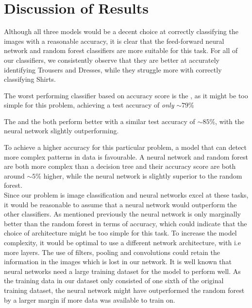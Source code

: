 \section{Discussion of Results}
Although all three models would be a decent choice at correctly classifying the images with a reasonable accuracy, it is clear that the feed-forward neural network and random forest classifiers are more suitable for this task.
For all of our classifiers, we consistently observe that they are better at accurately identifying Trousers and Dresses, while they struggle more with correctly classifying Shirts.
\newline

The worst performing classifier based on accuracy score is the , as it might be too simple for this problem, achieving a test accuracy of \textit{only} $\sim79\%$
\newline

The  and the  both perform better with a similar test accuracy of $\sim85\%$, with the neural network slightly outperforming.
\newline

To achieve a higher accuracy for this particular problem, a model that can detect more complex patterns in data is favourable.
A neural network and random forest are both more complex than a decision tree and their accuracy score are both around $\sim5\%$ higher,
while the neural network is slightly superior to the random forest. \\

Since our problem is image classification and neural networks excel at these tasks, it would be reasonable to assume that a neural network would outperform the other classifiers.
As mentioned previously the neural network is only marginally better than the random forest in terms of accuracy, which could indicate that the choice of architecture might be too simple for this task.
To increase the model complexity, it would be optimal to use a different network architecture, with i.e more layers.
The use of filters, pooling and convolutions could retain the information in the images which is lost in our network.
It is well known that neural networks need a large training dataset for the model to perform well.
As the training data in our dataset only consisted of one sixth of the original training dataset,
the neural network might have outperformed the random forest by a larger margin if more data was available to train on.


